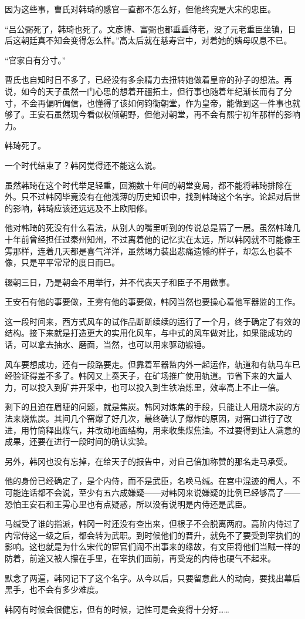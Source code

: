 因为这些事，曹氏对韩琦的感官一直都不怎么好，但他终究是大宋的忠臣。

“吕公弼死了，韩琦也死了。文彦博、富弼也都垂垂待老，没了元老重臣坐镇，日后这朝廷真不知会变得怎么样。”高太后就在慈寿宫中，对着她的姨母叹息不已。

“官家自有分寸。”

曹氏也自知时日不多了，已经没有多余精力去扭转她做着皇帝的孙子的想法。再说，如今的天子虽然一门心思的想着开疆拓土，但行事也随着年纪渐长而有了分寸，不会再偏听偏信，也懂得了该如何钧衡朝堂，作为皇帝，能做到这一件事也就够了。王安石虽然现今看似权倾朝野，但他对朝堂，再不会有熙宁初年那样的影响力。

韩琦死了。

一个时代结束了？韩冈觉得还不能这么说。

虽然韩琦在这个时代举足轻重，回溯数十年间的朝堂变局，都不能将韩琦排除在外。只不过韩冈毕竟没有在他浅薄的历史知识中，找到韩琦这个名字。论起对后世的影响，韩琦应该还远远及不上欧阳修。

他对韩琦的死没有什么看法，从别人的嘴里听到的传说总是隔了一层。虽然韩琦几十年前曾经担任过秦州知州，不过离着他的记忆实在太远，所以韩冈就不可能像王雱那样，连着几天都是喜气洋洋，虽然竭力装出悲痛遗憾的样子，却怎么也装不像，只是平平常常的度日而已。

辍朝三日，乃是朝会不用举行，并不代表天子和臣子不用做事。

王安石有他的事要做，王雱有他的事要做，韩冈当然也要操心着他军器监的工作。

这一段时间来，西方式风车的试作品断断续续的运行了一个月，终于确定了有效的结构。接下来就是打造更大的实用化风车，与中式的风车做对比，如果能成功的话，可以拿去抽水、磨面，当然，也可以用来驱动锻锤。

风车要想成功，还有一段路要走。但靠着军器监内外一起运作，轨道和有轨马车已经验证得差不多了。韩冈又上奏天子，在矿场推广使用轨道。节省下来的大量人力，可以投入到矿井开采中，也可以投入到生铁冶炼里，效率高上不止一倍。

剩下的且迫在眉睫的问题，就是焦炭。韩冈对炼焦的手段，只能让人用烧木炭的方法来烧焦炭。其间几个窑爆了好几次，最终确认了爆炸的原因，对窑口进行了改进，用竹筒释出煤气，并改动地面结构，用来收集煤焦油。不过要得到让人满意的成果，还要在进行一段时间的确认实验。

另外，韩冈也没有忘掉，在给天子的报告中，对自己倍加称赞的那名走马承受。

他的身份已经确定了，是个内侍，而不是武臣，名唤马缄。在宫中混迹的阉人，不可能连话都不会说，至少有五六成嫌疑——对韩冈来说嫌疑的比例已经够高了——恐怕王安石和王雱心里也有点疑惑，所以没有说明是内侍还是武臣。

马缄受了谁的指派，韩冈一时还没有查出来，但根子不会脱离两府。高阶内侍过了内常侍这一级之后，都会转为武职。到时候他们的晋升，就免不了要受到宰执们的影响。这也就是为什么宋代的宦官们闹不出事来的缘故，有文臣将他们当贼一样的防着，前途又被人攥在手里，在宰执们面前，再受宠的内侍也硬气不起来。

默念了两遍，韩冈记下了这个名字。从今以后，只要留意此人的动向，要找出幕后黑手，也不会有多少难度。

韩冈有时候会很健忘，但有的时候，记性可是会变得十分好……

